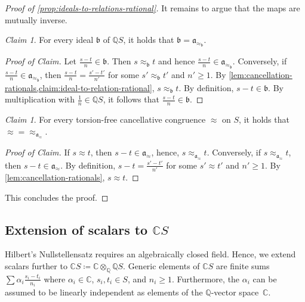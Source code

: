 \documentclass[11pt]{scrartcl}
\theoremstyle{definition}
\theoremstyle{plain}
\theoremstyle{remark}
\newtheorem{claim}[definition]{Claim}
\newenvironment{claimproof}[1][Proof of Claim]{\begin{proof}[#1] \renewcommand{\qedsymbol}{$\lrcorner$}}{ \end{proof}}
\begin{document}
\begin{proof}[Proof of \cref{prop:ideals-to-relations-rational}]
		It remains to argue that the maps are mutually inverse.

		\begin{claim}
			For every ideal $\mathfrak{b}$ of $\mathbb{Q}S$,
			it holds that
			$\mathfrak{b} = \mathfrak{a}_{\approx_{\mathfrak{b}}}$.
		\end{claim}
		\begin{claimproof}
			Let $\frac{s - t}{n} \in \mathfrak{b}$.
			Then $s \approx_{\mathfrak{b}} t$
			and hence $\frac{s - t}n \in \mathfrak{a}_{\approx_{\mathfrak{b}}}$.
			Conversely, 
			if $\frac{s - t}{n} \in \mathfrak{a}_{\approx_{\mathfrak{b}}}$,
			then $\frac{s - t}{n} = \frac{s' -t'}{n'}$ for some $s' \approx_{\mathfrak{b}} t'$ and $n' \geq 1$.
			By \cref{lem:cancellation-rationals,claim:ideal-to-relation-rational},
			 $s \approx_{\mathfrak{b}} t$.
			By definition, $ s - t \in \mathfrak{b}$.
			By multiplication with $\frac1n \in \mathbb{Q}S$,
			it follows that
			$\frac{s-t}{n} \in \mathfrak{b}$.
		\end{claimproof}

		\begin{claim}
			For every torsion-free cancellative congruence $\approx$ on $S$,
			it holds that
			${\approx} = {\approx_{\mathfrak{a}_{\approx}}}$.
		\end{claim}
		\begin{claimproof}
			If $s \approx t$,
			then $s - t \in \mathfrak{a}_{\approx}$,
			hence, $s \approx_{\mathfrak{a}_{\approx}} t$.
			Conversely,
			if $s \approx_{\mathfrak{a}_{\approx}} t$,
			then $s - t \in \mathfrak{a}_{\approx}$.
			By definition, $s - t = \frac{s' - t'}{n'}$ for some $s' \approx t'$ and $n'\geq 1$.
			By \cref{lem:cancellation-rationals},
			$s \approx t$.
		\end{claimproof}

		This concludes the proof.
	\end{proof}

	\subsection{Extension of scalars to \texorpdfstring{$\mathbb{C}S$}{CS}}
	\label{sec:extension-of-scalars-C}

	Hilbert's Nullstellensatz requires an algebraically closed field.
	Hence, we extend scalars further to $\mathbb{C}S \coloneqq \mathbb{C} \otimes_{\mathbb{Q}} \mathbb{Q}S$.
	Generic elements of $\mathbb{C}S$ are finite sums $\sum \alpha_i \frac{s_i - t_i}{n_i}$
	where $\alpha_i \in \mathbb{C}$,
	$s_i, t_i \in S$, and $n_i \geq 1$.
	Furthermore, the $\alpha_i$ can be assumed to be linearly independent as elements of the $\mathbb{Q}$-vector space~$\mathbb{C}$.
\end{document}
